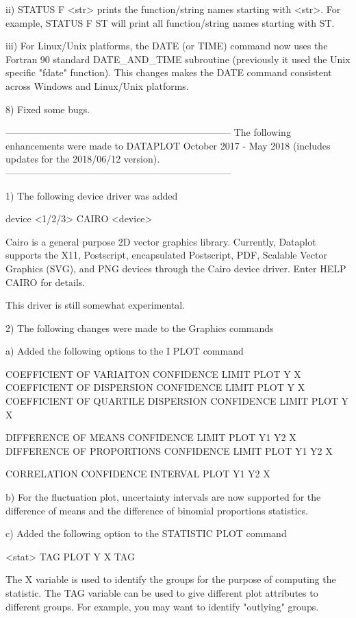        ii) STATUS F <str> prints the function/string names starting with
           <str>.  For example, STATUS F ST will print all function/string
           names starting with ST.

      iii) For Linux/Unix platforms, the DATE (or TIME) command now
           uses the Fortran 90 standard DATE_AND_TIME subroutine
           (previously it used the Unix specific "fdate" function).
           This changes makes the DATE command consistent across
           Windows and Linux/Unix platforms.

 8) Fixed some bugs.

-----------------------------------------------------------------------
The following enhancements were made to DATAPLOT
October 2017 - May 2018 (includes updates for the 2018/06/12 version).
-----------------------------------------------------------------------

 1) The following device driver was added

        device <1/2/3> CAIRO <device>

    Cairo is a general purpose 2D vector graphics library.  Currently,
    Dataplot supports the X11, Postscript, encapsulated Postscript,
    PDF, Scalable Vector Graphics (SVG), and PNG devices through
    the Cairo device driver.  Enter HELP CAIRO for details.

    This driver is still somewhat experimental.

 2) The following changes were made to the Graphics commands

    a) Added the following options to the I PLOT command

         COEFFICIENT OF VARIAITON CONFIDENCE LIMIT PLOT Y X
         COEFFICIENT OF DISPERSION CONFIDENCE LIMIT PLOT Y X
         COEFFICIENT OF QUARTILE DISPERSION CONFIDENCE LIMIT PLOT Y X

         DIFFERENCE OF MEANS CONFIDENCE LIMIT PLOT Y1 Y2 X
         DIFFERENCE OF PROPORTIONS CONFIDENCE LIMIT PLOT Y1 Y2 X

         CORRELATION CONFIDENCE INTERVAL PLOT Y1 Y2 X

    b) For the fluctuation plot, uncertainty intervals are now
       supported for the difference of means and the difference
       of binomial proportions statistics.

    c) Added the following option to the STATISTIC PLOT command

          <stat> TAG PLOT Y X TAG

       The X variable is used to identify the groups for the
       purpose of computing the statistic.  The TAG variable can
       be used to give different plot attributes to different
       groups.  For example, you may want to identify "outlying"
       groups.

